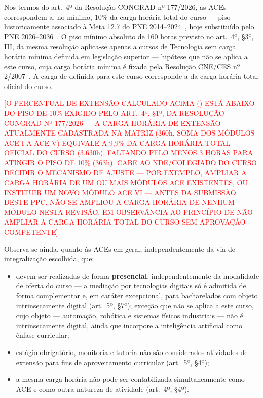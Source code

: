 Nos termos do art.\ 4º da Resolução CONGRAD nº 177/2026, as ACEs correspondem a, no mínimo, 10\% da carga horária total do curso — piso historicamente associado à Meta 12.7 do PNE 2014--2024~\cite{mec_pne_2014}, hoje substituído pelo PNE 2026--2036~\cite{mec_pne_2026}. O piso mínimo absoluto de 160 horas previsto no art.\ 4º, §3º, III, da mesma resolução aplica-se apenas a cursos de Tecnologia sem carga horária mínima definida em legislação superior — hipótese que não se aplica a este curso, cuja carga horária mínima é fixada pela Resolução CNE/CES nº 2/2007~\cite{cne_ces_2_2007}. A carga de \textbf{} definida para este curso corresponde a  da carga horária total oficial do curso.

\textcolor{red}{[O PERCENTUAL DE EXTENSÃO CALCULADO ACIMA () ESTÁ ABAIXO DO PISO DE 10\% EXIGIDO PELO ART.\ 4º, §1º, DA RESOLUÇÃO CONGRAD Nº 177/2026 — A CARGA HORÁRIA DE EXTENSÃO ATUALMENTE CADASTRADA NA MATRIZ (360h, SOMA DOS MÓDULOS ACE I A ACE V) EQUIVALE A 9,9\% DA CARGA HORÁRIA TOTAL OFICIAL DO CURSO (3.630h), FALTANDO PELO MENOS 3 HORAS PARA ATINGIR O PISO DE 10\% (363h). CABE AO NDE/COLEGIADO DO CURSO DECIDIR O MECANISMO DE AJUSTE — POR EXEMPLO, AMPLIAR A CARGA HORÁRIA DE UM OU MAIS MÓDULOS ACE EXISTENTES, OU INSTITUIR UM NOVO MÓDULO ACE VI — ANTES DA SUBMISSÃO DESTE PPC. NÃO SE AMPLIOU A CARGA HORÁRIA DE NENHUM MÓDULO NESTA REVISÃO, EM OBSERVÂNCIA AO PRINCÍPIO DE NÃO AMPLIAR A CARGA HORÁRIA TOTAL DO CURSO SEM APROVAÇÃO COMPETENTE]}

Observa-se ainda, quanto às ACEs em geral, independentemente da via de integralização escolhida, que:

\begin{itemize}
    \item devem ser realizadas de forma \textbf{presencial}, independentemente da modalidade de oferta do curso — a mediação por tecnologias digitais só é admitida de forma complementar e, em caráter excepcional, para bacharelados com objeto intrinsecamente digital (art.\ 5º, §7º); exceção que não se aplica a este curso, cujo objeto — automação, robótica e sistemas físicos industriais — não é intrinsecamente digital, ainda que incorpore a inteligência artificial como ênfase curricular;
    \item estágio obrigatório, monitoria e tutoria não são considerados atividades de extensão para fins de aproveitamento curricular (art.\ 5º, §4º);
    \item a mesma carga horária não pode ser contabilizada simultaneamente como ACE e como outra natureza de atividade (art.\ 4º, §4º).
\end{itemize}

